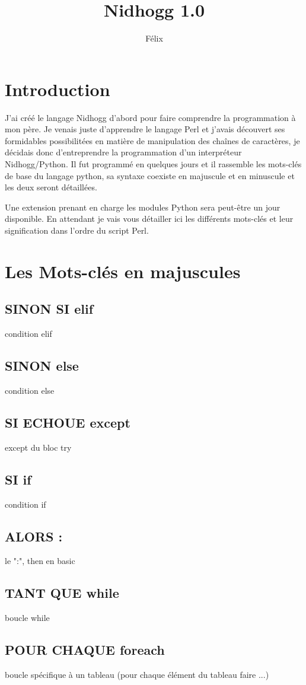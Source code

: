 \documentclass{book}
\title{Nidhogg 1.0}
\author{Félix \bsc{Foriel}}
\begin{document}
\maketitle
\chapter{Introduction}
J'ai créé le langage Nidhogg d'abord pour faire comprendre la programmation à mon père. Je venais juste d'apprendre le langage Perl et j'avais découvert ses
formidables possibilitées en matière de manipulation des chaînes de caractères, je décidais donc d'entreprendre la programmation d'un interpréteur Nidhogg/Python.
Il fut programmé en quelques jours et il rassemble les mots-clés de base du langage python, sa syntaxe coexiste en majuscule et en minuscule et les deux 
seront détaillées.
 
Une extension prenant en charge les modules Python sera peut-être un jour disponible. En attendant je vais vous détailler ici les différents mots-clés et 
leur signification dans l'ordre du script Perl.

\chapter{Les Mots-clés en majuscules}
\section{SINON SI elif }
  condition elif
\section{SINON else }
  condition else
\section{SI ECHOUE except }
  except du bloc try
\section{SI if }
  condition if
\section{ALORS : }
  le ":", then en basic
\section{TANT QUE while }
  boucle while
\section{POUR CHAQUE foreach }
  boucle spécifique à un tableau (pour chaque élément du tableau faire ...)
\end{document}
